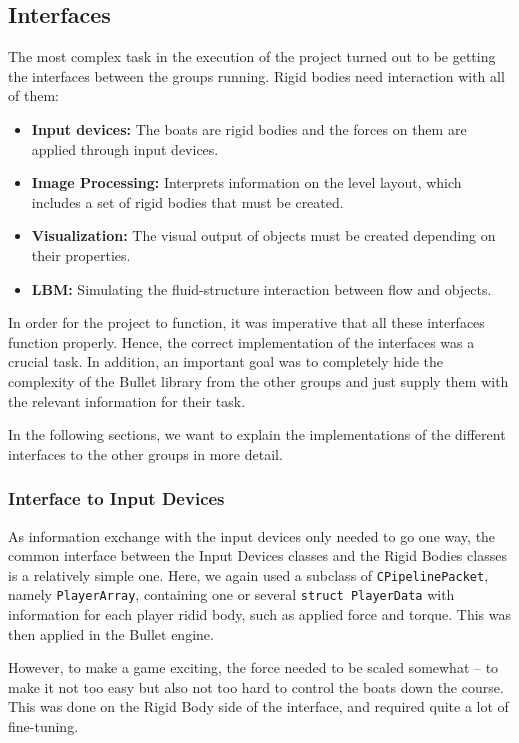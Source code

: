 \subsection{Interfaces}
The most complex task in the execution of the project turned out to be getting the interfaces between the groups running. Rigid bodies need interaction with all of them:
\begin{itemize}
\item \textbf{Input devices:} The boats are rigid bodies and the forces on them are applied through input devices.
\item \textbf{Image Processing:} Interprets information on the level layout, which includes a set of rigid bodies that must be created.
\item \textbf{Visualization:} The visual output of objects must be created depending on their properties.
\item \textbf{LBM:} Simulating the fluid-structure interaction between flow and objects.
\end{itemize}
In order for the project to function, it was imperative that all these interfaces function properly. Hence, the correct implementation of the interfaces was a crucial task.
In addition, an important goal was to completely hide the complexity of the Bullet library from the other groups and just supply them with the relevant information for their task.

In the following sections, we want to explain the implementations of the different interfaces to the other groups in more detail.

\subsubsection{Interface to Input Devices}
As information exchange with the input devices only needed to go one way, the common interface between the Input Devices classes and the Rigid Bodies classes is a relatively simple one. Here, we again used a subclass of \texttt{CPipelinePacket}, namely \texttt{PlayerArray}, containing one or several \texttt{struct PlayerData} with information for each player ridid body, such as applied force and torque. This was then applied in the Bullet engine. 

However, to make a game exciting, the force needed to be scaled somewhat -- to make it not too easy but also not too hard to control the boats down the course. This was done on the Rigid Body side of the interface, and required quite a lot of fine-tuning. 

